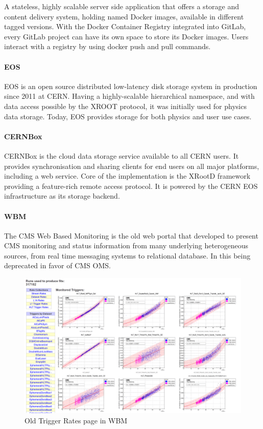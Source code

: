 A stateless, highly scalable server side application that offers a storage and content delivery system, holding named Docker images, available in different tagged versions. With the Docker Container Registry integrated into GitLab, every GitLab project can have its own space to store its Docker images. Users interact with a registry by using docker push and pull commands.

\paragraph{EOS}

EOS \cite{Peters_2015} is an open source distributed low-latency disk storage system in production since 2011 at CERN. Having a highly-scalable hierarchical namespace, and with data access possible by the XROOT protocol, it was initially used for physics data storage. Today, EOS provides storage for both physics and user use cases.

\paragraph{CERNBox}

CERNBox \cite{Mascetti_2015} is the cloud data storage service available to all CERN users. It provides synchronisation and sharing clients for end users on all major platforms, including a web service. Core of the implementation is the XRootD framework providing a feature-rich remote access protocol. It is powered by the CERN EOS infrastructure as its storage backend.

\paragraph{WBM} The CMS Web Based Monitoring \cite{badgett2014web} is the old web portal that developed to present CMS monitoring and status information from many underlying heterogeneous sources, from real time messaging systems to relational database. In this being deprecated in favor of CMS OMS.

\begin{figure}
    \centerline{
        \includegraphics[width=0.9\paperwidth]{figures/wbm.png}}
    \caption{Old Trigger Rates page in WBM}
    \label{fig:ratemon_ui0}
\end{figure}

